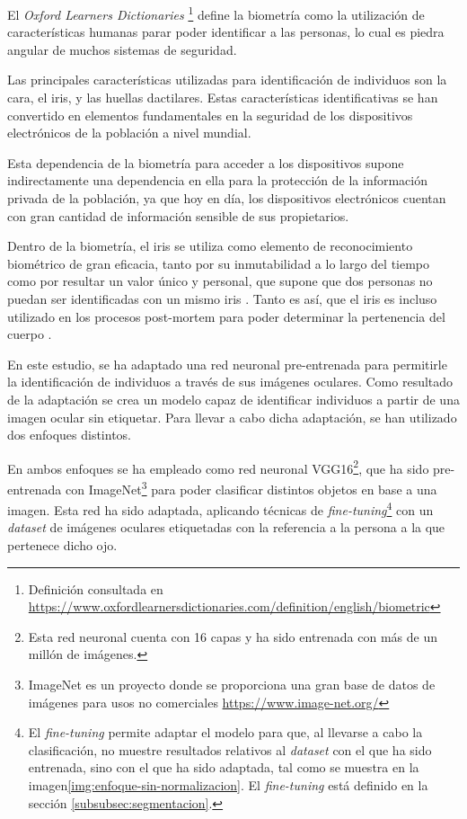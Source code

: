  \label{capitulo1}

El \textit{Oxford Learners Dictionaries} \footnote{Definición consultada en \url{https://www.oxfordlearnersdictionaries.com/definition/english/biometric}} define la biometría como la utilización de características humanas parar poder identificar a las personas, lo cual es piedra angular de muchos sistemas de seguridad.

Las principales características utilizadas para identificación de individuos son la cara, el iris, y las huellas dactilares. Estas características identificativas se han convertido en elementos fundamentales en la seguridad de los dispositivos electrónicos de la población a nivel mundial. 

Esta dependencia de la biometría para acceder a los dispositivos supone indirectamente una dependencia en ella para la protección de la información privada de la población, ya que hoy en día, los dispositivos electrónicos cuentan con gran cantidad de información sensible de sus propietarios.

Dentro de la biometría, el iris se utiliza como elemento de reconocimiento biométrico de gran eficacia, tanto por su inmutabilidad a lo largo del tiempo como por resultar un valor único y 
personal, que supone que dos personas no puedan ser identificadas con un mismo iris \cite{malgheet_iris_2021}. Tanto es así, que el iris es incluso utilizado en los procesos 
post-mortem para poder determinar la pertenencia del cuerpo \cite{boyd_post-mortem_2020}.

En este estudio, se ha adaptado una red neuronal pre-entrenada para permitirle la identificación de individuos a través de sus imágenes oculares. Como resultado de la adaptación se crea un modelo capaz de identificar individuos a partir de una imagen ocular sin etiquetar.
Para llevar a cabo dicha adaptación, se han utilizado dos enfoques distintos.

En ambos enfoques se ha empleado como red neuronal VGG16\footnote{Esta red neuronal cuenta con 16 capas y ha sido entrenada con más de un millón de imágenes.}, que ha sido pre-entrenada con ImageNet\footnote{ImageNet es un proyecto donde se proporciona 
una gran base de datos de imágenes para usos no comerciales \url{https://www.image-net.org/}} para poder clasificar distintos objetos en base a una imagen. Esta red ha sido adaptada, aplicando técnicas de \textit{fine-tuning}\footnote{El \textit{fine-tuning} 
permite adaptar el modelo para que, al llevarse a cabo la clasificación, no muestre resultados relativos al \textit{dataset} con el que ha sido entrenada, sino con el que ha sido adaptada, tal como se muestra en la imagen\ref{img:enfoque-sin-normalizacion}. El \textit{fine-tuning} está definido en la sección \ref{subsubsec:segmentacion}.}
 con un \textit{dataset} de imágenes oculares etiquetadas con la referencia a la persona a la que pertenece dicho ojo.

